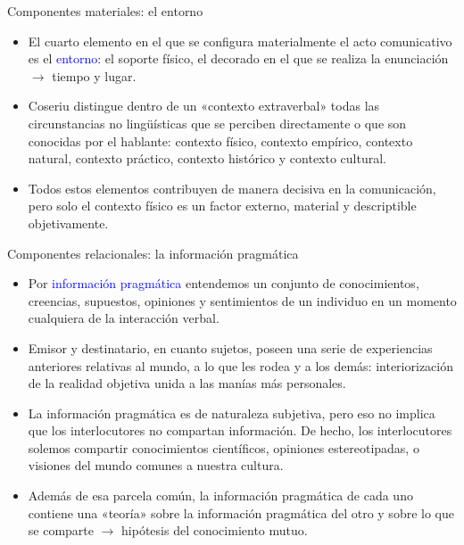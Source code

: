 \documentclass{beamer}
\begin{document}
\begin{frame}{Componentes materiales: el entorno}

\begin{itemize}
	\item El cuarto elemento en el que se configura materialmente el acto comunicativo es el \textcolor{blue}{entorno}: el soporte físico, el decorado en el que se realiza la enunciación $\rightarrow$ tiempo y lugar.
	\item Coseriu distingue dentro de un «contexto extraverbal» todas las circunstancias no lingüísticas que se perciben directamente o que son conocidas por el hablante: contexto físico, contexto empírico, contexto natural, contexto práctico, contexto histórico y contexto cultural.
	\item Todos estos elementos contribuyen de manera decisiva en la comunicación, pero solo el contexto físico es un factor externo, material y descriptible objetivamente.
\end{itemize}

\end{frame}

\begin{frame}{Componentes relacionales: la información pragmática}

\begin{itemize}
	\item Por \textcolor{blue}{información pragmática} entendemos un conjunto de conocimientos, creencias, supuestos, opiniones y sentimientos de un individuo en un momento cualquiera de la interacción verbal.
	\item Emisor y destinatario, en cuanto sujetos, poseen una serie de experiencias anteriores relativas al mundo, a lo que les rodea y a los demás: interiorización de la realidad objetiva unida a las manías más personales. 
	\item La información pragmática es de naturaleza subjetiva, pero eso no implica que los interlocutores no compartan información. De hecho, los interlocutores solemos compartir conocimientos científicos, opiniones estereotipadas, o visiones del mundo comunes a nuestra cultura.
	\item Además de esa parcela común, la información pragmática de cada uno contiene una «teoría» sobre la información pragmática del otro y sobre lo que se comparte $\rightarrow$ hipótesis del conocimiento mutuo. 
\end{itemize}

\end{frame}
\end{document}
